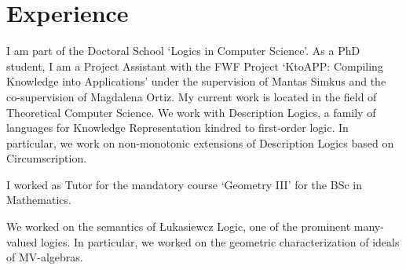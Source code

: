 \documentclass[letterpaper]{deedy-resume} %
\begin{document}
%
\begin{minipage}[t]{0.66\textwidth} %


\section{Experience}


\vspace{\topsep} %
\begin{tightitemize}
\item I am part of the Doctoral School `Logics in Computer Science'. As a PhD student, I am a Project Assistant with the FWF Project `KtoAPP: Compiling Knowledge into Applications' under the supervision of Mantas Simkus and the co-supervision of Magdalena Ortiz. My current work is located in the field of Theoretical Computer Science. We work with Description Logics, a family of languages for Knowledge Representation kindred to first-order logic. In particular, we work on non-monotonic extensions of Description Logics based on Circumscription. 
\end{tightitemize}

\sectionspace %


\begin{tightitemize}
\item I worked as Tutor for the mandatory course `Geometry III' for the BSc in Mathematics. 
\end{tightitemize}

\sectionspace


\begin{tightitemize}
\item We worked on the semantics of {\L}ukasiewcz Logic, one of the prominent many-valued logics. In particular, we worked on the geometric characterization of ideals of MV-algebras. 
\end{tightitemize}


\end{minipage}
\end{document}
